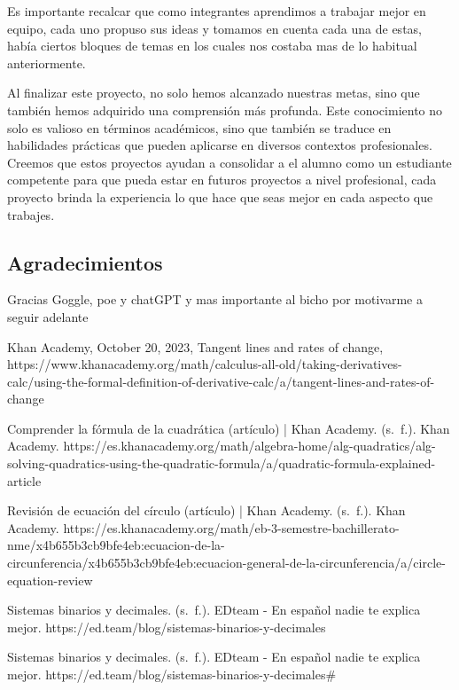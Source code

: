 \documentclass[conference]{IEEEtran}
\begin{document}
Es importante recalcar que como integrantes aprendimos a trabajar mejor en equipo, cada uno propuso sus ideas y tomamos en cuenta cada una de estas, había ciertos bloques de temas en los cuales nos costaba mas de lo habitual anteriormente. 

Al finalizar este proyecto, no solo hemos alcanzado nuestras metas, sino que también hemos adquirido una comprensión más profunda. Este conocimiento no solo es valioso en términos académicos, sino que también se traduce en habilidades prácticas que pueden aplicarse en diversos contextos profesionales.
Creemos que estos proyectos ayudan a consolidar a el alumno como un estudiante competente para que pueda estar en futuros proyectos a nivel profesional, cada proyecto brinda la experiencia lo que hace que seas mejor en cada aspecto que trabajes.

\subsection{Agradecimientos}
Gracias  Goggle, poe y chatGPT y mas importante al bicho por motivarme  a seguir adelante

\begin{thebibliography}{00}
  Khan Academy, October 20, 2023, Tangent lines and rates of change,
  https://www.khanacademy.org/math/calculus-all-old/taking-derivatives-calc/using-the-formal-definition-of-derivative-calc/a/tangent-lines-and-rates-of-change


    Comprender la fórmula de la cuadrática (artículo) | Khan Academy. (s. f.). Khan Academy. https://es.khanacademy.org/math/algebra-home/alg-quadratics/alg-solving-quadratics-using-the-quadratic-formula/a/quadratic-formula-explained-article


    Revisión de ecuación del círculo (artículo) | Khan Academy. (s. f.). Khan Academy. https://es.khanacademy.org/math/eb-3-semestre-bachillerato-nme/x4b655b3cb9bfe4eb:ecuacion-de-la-circunferencia/x4b655b3cb9bfe4eb:ecuacion-general-de-la-circunferencia/a/circle-equation-review

    Sistemas binarios y decimales. (s. f.). EDteam - En español nadie te explica mejor. https://ed.team/blog/sistemas-binarios-y-decimales

    Sistemas binarios y decimales. (s. f.). EDteam - En español nadie te explica mejor. https://ed.team/blog/sistemas-binarios-y-decimales#
    
\end{thebibliography}
\end{document}
